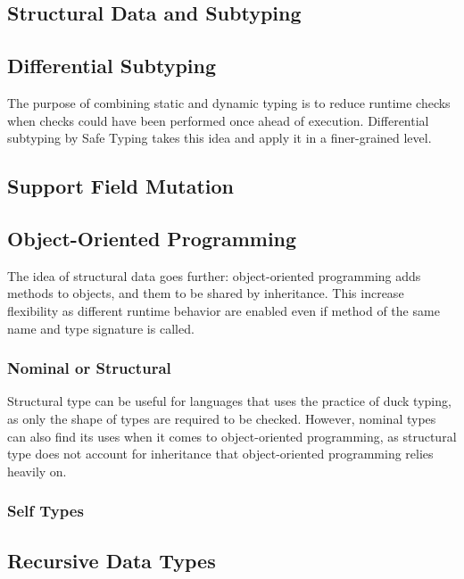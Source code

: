 \subsection{Structural Data and Subtyping}

\subsection{Differential Subtyping}

The purpose of combining static and dynamic typing is to reduce
runtime checks when checks could have been performed once ahead of execution.
Differential subtyping by Safe Typing takes this idea and apply it in a finer-grained level.

\subsection{Support Field Mutation}

\subsection{Object-Oriented Programming}

The idea of structural data goes further: object-oriented programming adds methods to objects,
and them to be shared by inheritance.
This increase flexibility as different runtime behavior are enabled even if method of the same name and type signature is called.

\subsubsection{Nominal or Structural}

Structural type can be useful for languages that uses the practice of duck typing, as only the shape of types are required to be checked.
However, nominal types can also find its uses when it comes to object-oriented programming,
as structural type does not account for inheritance that object-oriented programming relies heavily on.

\subsubsection{Self Types}

\subsection{Recursive Data Types}

